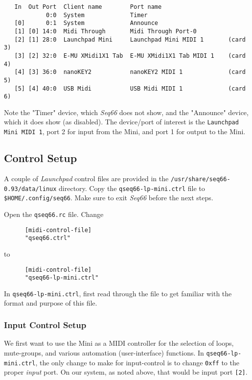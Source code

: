    \begin{verbatim}
   In  Out Port  Client name        Port name
            0:0  System             Timer
   [0]      0:1  System             Announce
   [1] [0] 14:0  Midi Through       Midi Through Port-0
   [2] [1] 28:0  Launchpad Mini     Launchpad Mini MIDI 1       (card 3)
   [3] [2] 32:0  E-MU XMidi1X1 Tab  E-MU XMidi1X1 Tab MIDI 1    (card 4)
   [4] [3] 36:0  nanoKEY2           nanoKEY2 MIDI 1             (card 5)
   [5] [4] 40:0  USB Midi           USB Midi MIDI 1             (card 6)
   \end{verbatim}

   Note the "Timer" device, which \textsl{Seq66} does not show, and the
   "Announce" device, which it does show (as disabled).  The device/port of
   interest is the \texttt{Launchpad Mini MIDI 1}, port 2 for input from
   the Mini, and port 1 for output to the Mini.

\subsection{Control Setup}
\label{subsec:launchpad_mini_control_setup}

   A couple of \textsl{Launchpad} control files are provided in the
   \texttt{/usr/share/seq66-0.93/data/linux} directory.
   Copy the \texttt{qseq66-lp-mini.ctrl} file to
   \texttt{\$HOME/.config/seq66}.
   Make sure to exit \textsl{Seq66} before the next steps.

   Open the \texttt{qseq66.rc} file.  Change

   \begin{verbatim}
      [midi-control-file]
      "qseq66.ctrl"
   \end{verbatim}

   to

   \begin{verbatim}
      [midi-control-file]
      "qseq66-lp-mini.ctrl"
   \end{verbatim}

   In \texttt{qseq66-lp-mini.ctrl}, first read through the file to get familiar
   with the format and purpose of this file.

\subsubsection{Input Control Setup}
\label{subsubsec:launchpad_mini_input_control_setup}

   We first want to use the Mini as a MIDI controller for
   the selection of loops, mute-groups, and various automation (user-interface)
   functions.
   In \texttt{qseq66-lp-mini.ctrl},
   the only change to make for input-control is
   to change \texttt{0xff} to the proper \textsl{input} port.  On our system,
   as noted above, that would be input port \texttt{[2]}.

